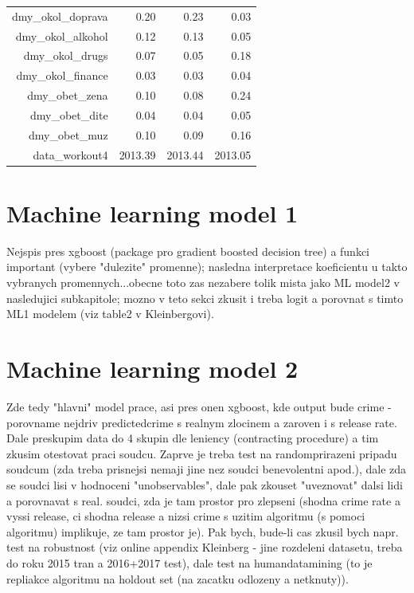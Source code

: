 \documentclass[12pt, twoside]{book} %
\begin{document}
\begin{table}[ht]
\begin{tabular}{rrrr}
  dmy\_okol\_doprava & 0.20 & 0.23 & 0.03 \\ 
  dmy\_okol\_alkohol & 0.12 & 0.13 & 0.05 \\ 
  dmy\_okol\_drugs & 0.07 & 0.05 & 0.18 \\ 
  dmy\_okol\_finance & 0.03 & 0.03 & 0.04 \\ 
  dmy\_obet\_zena & 0.10 & 0.08 & 0.24 \\ 
  dmy\_obet\_dite & 0.04 & 0.04 & 0.05 \\ 
  dmy\_obet\_muz & 0.10 & 0.09 & 0.16 \\ 
  data\_workout4 & 2013.39 & 2013.44 & 2013.05 \\ 
   \hline
\end{tabular}
\end{table}








\section{Machine learning model 1}   %

Nejspis pres xgboost (package pro gradient boosted decision tree) a funkci important (vybere "dulezite" promenne); nasledna interpretace koeficientu u takto vybranych promennych...obecne toto zas nezabere tolik mista jako ML model2 v nasledujici subkapitole; mozno v teto sekci zkusit i treba logit a porovnat s timto ML1 modelem (viz table2 v Kleinbergovi).


\section{Machine learning model 2}     %

Zde tedy "hlavni" model prace, asi pres onen xgboost, kde output bude crime - porovname nejdriv predictedcrime s realnym zlocinem a zaroven i s release rate. Dale preskupim data do 4 skupin dle leniency (contracting procedure) a tim zkusim otestovat praci soudcu. Zaprve je treba test na randomprirazeni pripadu soudcum (zda treba prisnejsi nemaji jine  nez soudci benevolentni apod.), dale zda se soudci lisi v hodnoceni "unobservables", dale pak zkouset "uveznovat" dalsi lidi a porovnavat s real. soudci, zda je tam prostor pro zlepseni (shodna crime rate a vyssi release, ci shodna release a nizsi crime s uzitim algoritmu (s pomoci algoritmu) implikuje, ze tam prostor je).\newline
Pak bych, bude-li cas zkusil bych napr. test na robustnost (viz online appendix Kleinberg - jine rozdeleni datasetu, treba do roku 2015 tran a 2016+2017 test), dale test na humandatamining (to je repliakce algoritmu na holdout set (na zacatku odlozeny a netknuty)).
\end{document}
